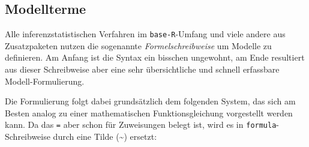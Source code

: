 \documentclass[
]{book}
\begin{document}
\hypertarget{modellterme}{%
\subsection{Modellterme}\label{modellterme}}

Alle inferenzstatistischen Verfahren im \texttt{base-R}-Umfang und viele andere aus Zusatzpaketen nutzen die sogenannte \emph{Formelschreibweise} um Modelle zu definieren.
Am Anfang ist die Syntax ein bisschen ungewohnt, am Ende resultiert aus dieser Schreibweise aber eine sehr übersichtliche und schnell erfassbare Modell-Formulierung.

Die Formulierung folgt dabei grundsätzlich dem folgenden System, das sich am Besten analog zu einer mathematischen Funktionsgleichung vorgestellt werden kann. Da das \texttt{=} aber schon für Zuweisungen belegt ist, wird es in \texttt{formula}-Schreibweise durch eine Tilde (\textasciitilde) ersetzt:

 
  \providecommand{\huxb}[2]{\arrayrulecolor[RGB]{#1}\global\arrayrulewidth=#2pt}
  \providecommand{\huxvb}[2]{\color[RGB]{#1}\vrule width #2pt}
  \providecommand{\huxtpad}[1]{\rule{0pt}{#1}}
  \providecommand{\huxbpad}[1]{\rule[-#1]{0pt}{#1}}
\end{document}

